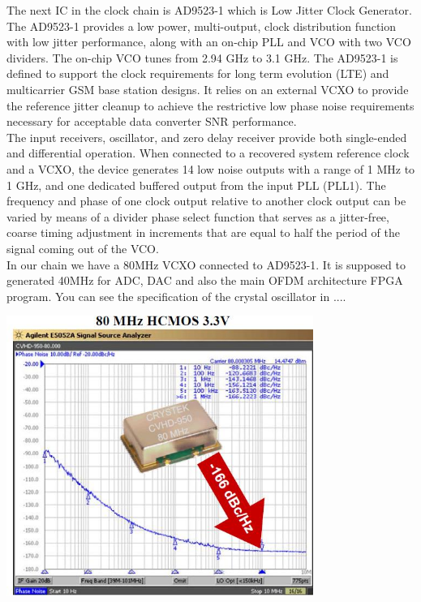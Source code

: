 The next IC in the clock chain is AD9523-1 which is Low Jitter Clock Generator. The AD9523-1 provides a low power, multi-output, clock distribution function with low jitter performance, along with an on-chip PLL and VCO with two VCO dividers. The on-chip VCO tunes from 2.94 GHz to 3.1 GHz. The AD9523-1 is defined to support the clock requirements for
long term evolution (LTE) and multicarrier GSM base station designs. It relies on an external VCXO to provide the reference
jitter cleanup to achieve the restrictive low phase noise requirements necessary for acceptable data converter SNR performance.\\
The input receivers, oscillator, and zero delay receiver provide both single-ended and differential operation. When connected to a recovered system reference clock and a VCXO, the device generates 14 low noise outputs with a range of 1 MHz to 1 GHz, and one dedicated buffered output from the input PLL (PLL1). The frequency and phase of one clock output relative to another clock output can be varied by means of a divider phase select function that serves as a jitter-free, coarse timing adjustment in increments that are equal to half the period of the signal coming out of the VCO.\\
In  our chain we have a 80MHz VCXO connected to AD9523-1. It is supposed to generated 40MHz for ADC, DAC and also the main OFDM architecture FPGA program. You can see the specification of the crystal oscillator in ....\\

\begin{center}
\includegraphics[width=10cm]{content/fig/cvhd.JPG}
\end{center}



